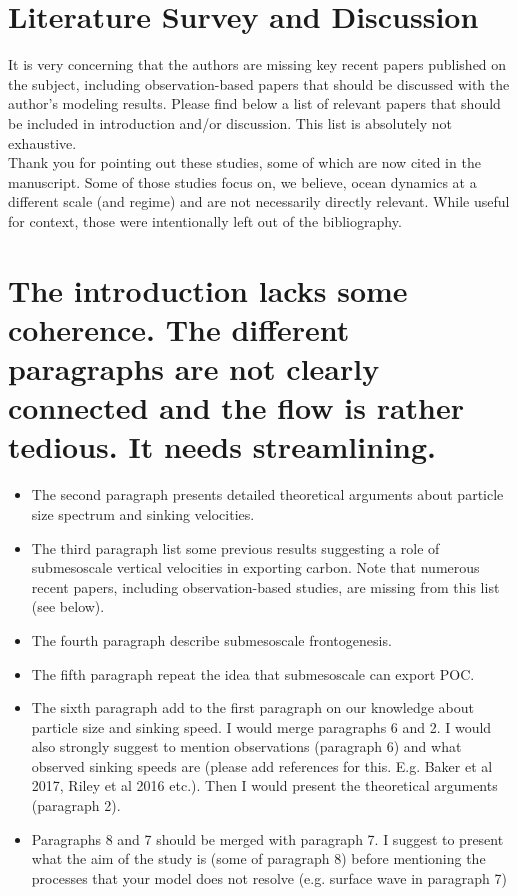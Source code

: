 \documentclass[12pt,letter]{article}
\begin{document}
\section*{Literature Survey and Discussion}
It is very concerning that the authors are missing key recent papers published on the subject, including observation-based papers that should be discussed with the author's modeling results. Please find below a list of relevant papers that should be included in introduction and/or discussion. This list is absolutely not exhaustive.\\

{\color{blue} Thank you for pointing out these studies, some of which are now cited in the manuscript. Some of those studies focus on, we believe, ocean dynamics at a different scale (and regime) and are not necessarily directly relevant. While useful for context, those were intentionally left out of the bibliography.\\}


\section*{The introduction lacks some coherence. The different paragraphs are not clearly connected and the flow is rather tedious. It needs streamlining. }
\begin{itemize}
	\item	The second paragraph presents detailed theoretical arguments about particle size spectrum and sinking velocities.
	\item	The third paragraph list some previous results suggesting a role of submesoscale vertical velocities in exporting carbon. Note that numerous recent papers, including observation-based studies, are missing from this list (see below).
	\item	The fourth paragraph describe submesoscale frontogenesis.
	\item	The fifth paragraph repeat the idea that submesoscale can export POC.
	\item	The sixth paragraph add to the first paragraph on our knowledge about particle size and sinking speed. I would merge paragraphs 6 and 2. I would also strongly suggest to mention observations (paragraph 6) and what observed sinking speeds are (please add references for this. E.g. Baker et al 2017, Riley et al 2016 etc.). Then I would present the theoretical arguments (paragraph 2).
	\item	Paragraphs 8 and 7 should be merged with paragraph 7. I suggest to present what the aim of the study is (some of paragraph 8) before mentioning the processes that your model does not resolve (e.g. surface wave in paragraph 7)
\end{itemize}
\end{document}

